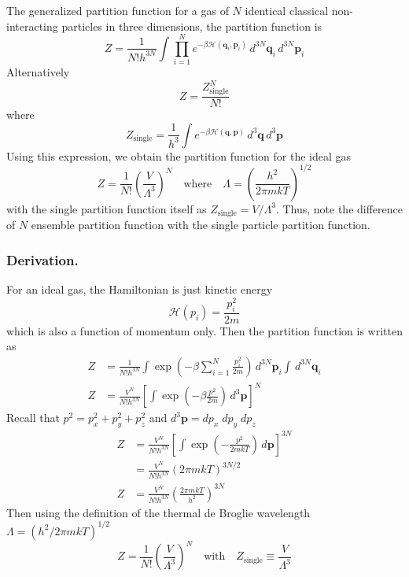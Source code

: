 \documentclass[../../../Main.tex]{subfiles}
\begin{document}
The generalized partition function for a gas of $N$ identical classical non-interacting particles in three dimensions, the partition function is
\begin{equation*}
	Z=\frac{1}{N!h^{3N}} \int \prod_{i=1}^{N} e^{-\beta \mathcal{H}(\mathbf{q}_i, \mathbf{p}_i)} \, d^{3N} \mathbf{q}_i \, d^{3N} \mathbf{p}_i
\end{equation*}
Alternatively
\begin{equation*}
	Z= \frac{Z^N_\text{single}}{N!}
\end{equation*}
where
\begin{equation*}
	Z_\text{single}= \frac{1}{h^{3}} \int e^{-\beta \mathcal{H}(\mathbf{q}, \mathbf{p})} \, d^{3} \mathbf{q} \, d^{3} \mathbf{p}
\end{equation*}
Using this expression, we obtain the partition function for the ideal gas
\begin{equation*}
	Z=\frac{1}{N!}\left(\frac{V}{\Lambda^3}\right)^N\quad\text{where}\quad \Lambda=\left(\frac{h^2}{2\pi mkT}\right)^{1/2}
\end{equation*}
with the single partition function itself as $Z_\text{single}=V/\Lambda^3$.
Thus, note the difference of $N$ ensemble partition function with the single particle partition function.

\subsubsection{Derivation.} For an ideal gas, the Hamiltonian is just kinetic energy
\begin{equation*}
	\mathcal{H}(p_i)=\frac{p_i^2}{2m}
\end{equation*}
which is also a function of momentum only.
Then the partition function is written as
\begin{align*}
	Z & =\frac{1}{N!h^{3N}} \int \exp\left(-\beta\sum_{i=1}^{N}\frac{p_i^2}{2m}\right) \, d^{3N} \mathbf{p}_i \int\, d^{3N} \mathbf{q}_i \\
	Z & =\frac{V^N}{N!h^{3N}}\left[ \int \exp\left(-\beta\frac{p^2}{2m}\right) \, d^{3} \mathbf{p} \right]^N
\end{align*}
Recall that $p^2=p_x^2 +p_y^2 +p_z^2$ and $d^{3} \mathbf{p}=dp_x\;dp_y\;dp_z$
\begin{align*}
	Z & =\frac{V^N}{N!h^{3N}}\left[ \int \exp\left(-\frac{p^2}{2mkT}\right) \, d\mathbf{p} \right]^{3N} \\
	  & =\frac{V^N}{N!h^{3N}}(2\pi mkT )^{3N/2}                                                         \\
	Z & =\frac{V^N}{N!h^{3N}}\left(\frac{2\pi mkT}{h^2}\right)^{3N}
\end{align*}
Then using the definition of the thermal de Broglie wavelength $\Lambda= (h^2/2\pi mkT)^{1/2}$
\begin{equation*}
	Z=\frac{1}{N!}\left(\frac{V}{\Lambda^3}\right)^N\quad\text{with} \quad Z_\text{single}\equiv\frac{V}{\Lambda^3}
\end{equation*}
\end{document}
